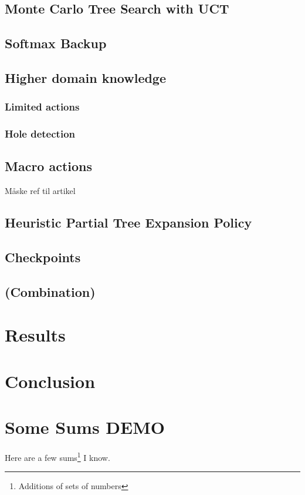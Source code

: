 \documentclass[10pt,a4paper,twoside]{article}
\begin{document}
\subsection{Monte Carlo Tree Search with UCT}
\subsection{Softmax Backup}
\subsection{Higher domain knowledge}
\subsubsection{Limited actions}
\subsubsection{Hole detection}
\subsection{Macro actions}
Måske ref til artikel \cite{salesman}
\subsection{Heuristic Partial Tree Expansion Policy}
\subsection{Checkpoints}

\subsection{(Combination)}

\section{Results}

\section{Conclusion}



\section{Some Sums DEMO}

Here are a few sums\footnote{Additions of sets of numbers}  I know.\label{sec:formulas}
\end{document}
